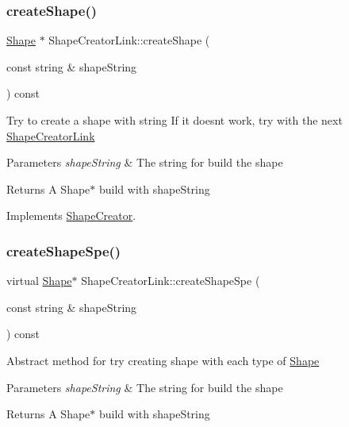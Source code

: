 \subsubsection{\texorpdfstring{create\+Shape()}{createShape()}}
{\footnotesize\ttfamily \hyperlink{class_shape}{Shape} $\ast$ Shape\+Creator\+Link\+::create\+Shape (\begin{DoxyParamCaption}\item[{const string \&}]{shape\+String }\end{DoxyParamCaption}) const\hspace{0.3cm}{\ttfamily [virtual]}}

Try to create a shape with string If it doesn\textquotesingle{}t work, try with the next \hyperlink{class_shape_creator_link}{Shape\+Creator\+Link} 
\begin{DoxyParams}{Parameters}
{\em shape\+String} & The string for build the shape \\
\hline
\end{DoxyParams}
\begin{DoxyReturn}{Returns}
A Shape$\ast$ build with shape\+String 
\end{DoxyReturn}


Implements \hyperlink{class_shape_creator_a515bc403dc9de02b126d52480ba6ee78}{Shape\+Creator}.

\hypertarget{class_shape_creator_link_a036ecc845946d23b36335e9077308bcf}{}\label{class_shape_creator_link_a036ecc845946d23b36335e9077308bcf} 
\subsubsection{\texorpdfstring{create\+Shape\+Spe()}{createShapeSpe()}}
{\footnotesize\ttfamily virtual \hyperlink{class_shape}{Shape}$\ast$ Shape\+Creator\+Link\+::create\+Shape\+Spe (\begin{DoxyParamCaption}\item[{const string \&}]{shape\+String }\end{DoxyParamCaption}) const\hspace{0.3cm}{\ttfamily [pure virtual]}}

Abstract method for try creating shape with each type of \hyperlink{class_shape}{Shape} 
\begin{DoxyParams}{Parameters}
{\em shape\+String} & The string for build the shape \\
\hline
\end{DoxyParams}
\begin{DoxyReturn}{Returns}
A Shape$\ast$ build with shape\+String 
\end{DoxyReturn}


